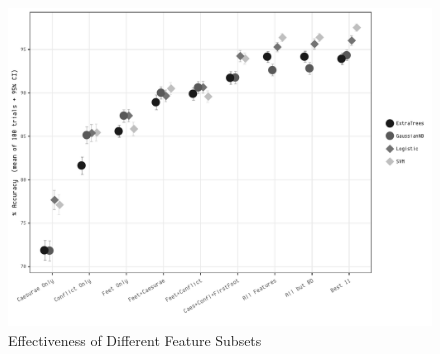 \documentclass[11pt,a4paper]{scrartcl} %
\begin{document}
\begin{figure}
    \caption{Effectiveness of Different Feature Subsets}
    \label{fig:feat_effectiv_bw}
    \includegraphics[width=\textwidth]{feat_effectiv_bw.pdf}
\end{figure}
\end{document}
